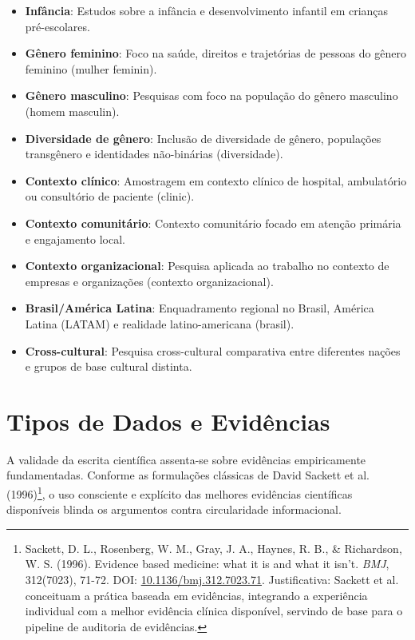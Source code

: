 \documentclass[12pt,a4paper,oneside]{abntex2}
\begin{document}
\begin{apendicesenv}
\begin{itemize}
    \item \textbf{Infância}: Estudos sobre a infância e desenvolvimento infantil em crianças pré-escolares.

    \item \textbf{Gênero feminino}: Foco na saúde, direitos e trajetórias de pessoas do gênero feminino (mulher feminin).

    \item \textbf{Gênero masculino}: Pesquisas com foco na população do gênero masculino (homem masculin).

    \item \textbf{Diversidade de gênero}: Inclusão de diversidade de gênero, populações transgênero e identidades não-binárias (diversidade).

    \item \textbf{Contexto clínico}: Amostragem em contexto clínico de hospital, ambulatório ou consultório de paciente (clinic).

    \item \textbf{Contexto comunitário}: Contexto comunitário focado em atenção primária e engajamento local.

    \item \textbf{Contexto organizacional}: Pesquisa aplicada ao trabalho no contexto de empresas e organizações (contexto organizacional).

    \item \textbf{Brasil/América Latina}: Enquadramento regional no Brasil, América Latina (LATAM) e realidade latino-americana (brasil).

    \item \textbf{Cross-cultural}: Pesquisa cross-cultural comparativa entre diferentes nações e grupos de base cultural distinta.
\end{itemize}

\section{Tipos de Dados e Evidências}

A validade da escrita científica assenta-se sobre evidências empiricamente fundamentadas. Conforme as formulações clássicas de David Sackett et al. (1996)\footnote{Sackett, D. L., Rosenberg, W. M., Gray, J. A., Haynes, R. B., \& Richardson, W. S. (1996). Evidence based medicine: what it is and what it isn't. \textit{BMJ}, 312(7023), 71-72. DOI: \href{https://doi.org/10.1136/bmj.312.7023.71}{10.1136/bmj.312.7023.71}. Justificativa: Sackett et al. conceituam a prática baseada em evidências, integrando a experiência individual com a melhor evidência clínica disponível, servindo de base para o pipeline de auditoria de evidências.}, o uso consciente e explícito das melhores evidências científicas disponíveis blinda os argumentos contra circularidade informacional.


\end{apendicesenv}
\end{document}
